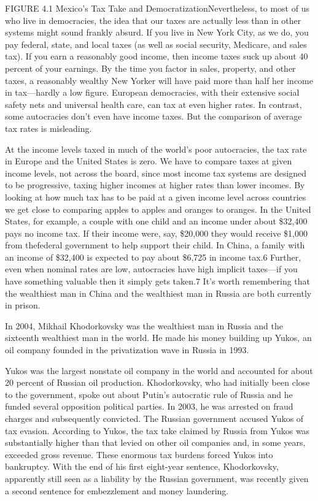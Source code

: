 \documentclass[10pt]{article}
\begin{document}
{\large FIGURE 4.1 Mexico's Tax Take and DemocratizationNevertheless, to most of
us who live in democracies, the idea that our taxes are actually less than in
other systems might sound frankly absurd. If you live in New York City, as we do,
you pay federal, state, and local taxes (as well as social security, Medicare,
and sales tax). If you earn a reasonably good income, then income taxes suck up
about 40 percent of your earnings. By the time you factor in sales, property, and
other taxes, a reasonably wealthy New Yorker will have paid more than half her
income in tax---hardly a low figure. European democracies, with their extensive
social safety nets and universal health care, can tax at even higher rates. In
contrast, some autocracies don't even have income taxes. But the comparison of
average tax rates is misleading.}

{\large At the income levels taxed in much of the world's poor autocracies, the
tax rate in Europe and the United States is zero. We have to compare taxes at
given income levels, not across the board, since most income tax systems are
designed to be progressive, taxing higher incomes at higher rates than lower
incomes. By looking at how much tax has to be paid at a given income level across
countries we get close to comparing apples to apples and oranges to oranges. In
the United States, for example, a couple with one child and an income under about
\$32,400 pays no income tax. If their income were, say, \$20,000 they would
receive \$1,000 from thefederal government to help support their child. In China,
a family with an income of \$32,400 is expected to pay about \$6,725 in income
tax.6 Further, even when nominal rates are low, autocracies have high implicit
taxes---if you have something valuable then it simply gets taken.7 It's worth
remembering that the wealthiest man in China and the wealthiest man in Russia are
both currently in prison.}

{\large In 2004, Mikhail Khodorkovsky was the wealthiest man in Russia and the
sixteenth wealthiest man in the world. He made his money building up Yukos, an
oil company founded in the privatization wave in Russia in 1993.}

{\large Yukos was the largest nonstate oil company in the world and accounted
for about 20 percent of Russian oil production. Khodorkovsky, who had initially
been close to the government, spoke out about Putin's autocratic rule of Russia
and he funded several opposition political parties. In 2003, he was arrested on
fraud charges and subsequently convicted. The Russian government accused Yukos of
tax evasion. According to Yukos, the tax take claimed by Russia from Yukos was
substantially higher than that levied on other oil companies and, in some years,
exceeded gross revenue. These enormous tax burdens forced Yukos into bankruptcy.
With the end of his first eight-year sentence, Khodorkovsky, apparently still
seen as a liability by the Russian government, was recently given a second
sentence for embezzlement and money laundering.}
\end{document}
